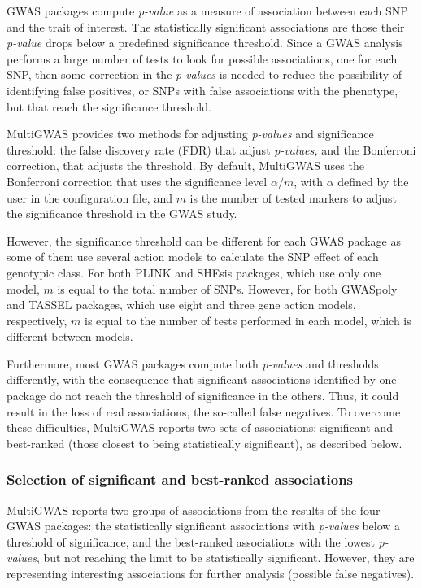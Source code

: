 \documentclass{article}
\begin{document}
GWAS packages compute \emph{p-value }as a measure of association between each SNP and the trait of interest. The statistically significant associations are those their \emph{p-value }drops below a predefined significance threshold. Since a GWAS analysis performs a large number of tests to look for possible associations, one for each SNP, then some correction in the \emph{p-values} is needed to reduce the possibility of identifying false positives, or SNPs with false associations with the phenotype, but that reach the significance threshold.

MultiGWAS provides two methods for adjusting \emph{p-values} and significance threshold: the false discovery rate (FDR) that adjust \emph{p-values, }and the Bonferroni correction, that adjusts the threshold. By default, MultiGWAS uses the Bonferroni correction that uses the significance level $\alpha/m$, with $\alpha$ defined by the user in the configuration file, and $m$ is the number of tested markers to adjust the significance threshold in the GWAS study. 

However, the significance threshold can be different for each GWAS package as some of them use several action models to calculate the SNP effect of each genotypic class. For both PLINK and SHEsis packages, which use only one model, $m$ is equal to the total number of SNPs. However, for both GWASpoly and TASSEL packages, which use eight and three gene action models, respectively, $m$ is equal to the number of tests performed in each model, which is different between models.

Furthermore, most GWAS packages compute both \emph{p-values} and thresholds differently, with the consequence that significant associations identified by one package do not reach the threshold of significance in the others. Thus, it could result in the loss of real associations, the so-called false negatives. To overcome these difficulties, MultiGWAS reports two sets of associations: significant and best-ranked (those closest to being statistically significant), as described below.

\subsubsection{Selection of significant and best-ranked associations}

MultiGWAS reports two groups of associations from the results of the four GWAS packages: the statistically significant associations with \emph{p-values} below a threshold of significance, and the best-ranked associations with the lowest \emph{p-values}, but not reaching the limit to be statistically significant. However, they are representing interesting associations for further analysis (possible false negatives).
\end{document}

